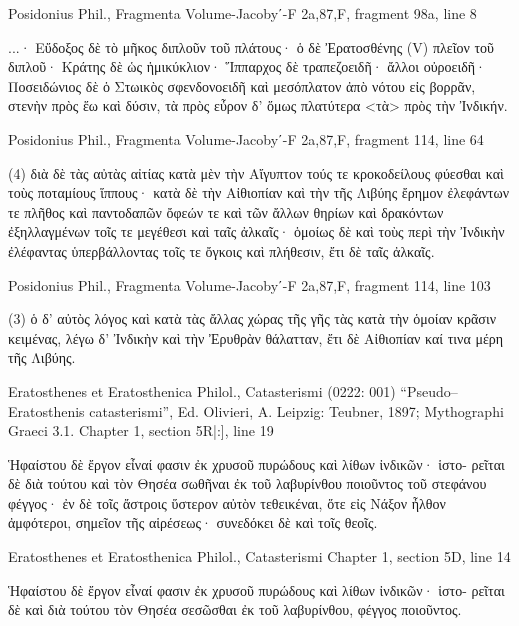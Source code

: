 \documentclass[12pt,letterpaper,twoside,final]{memoir}
\begin{document}
\begin{greek}
Posidonius Phil., Fragmenta 
Volume-Jacobyʹ-F 2a,87,F, fragment 98a, line 8

                           ...· Εὔδοξος δὲ τὸ μῆκος διπλοῦν τοῦ πλάτους· 
ὁ δὲ Ἐρατοσθένης (V) πλεῖον τοῦ διπλοῦ· Κράτης δὲ ὡς ἡμικύκλιον· 
Ἵππαρχος δὲ τραπεζοειδῆ· ἄλλοι οὐροειδῆ· Ποσειδώνιος δὲ ὁ Στωικὸς 
σφενδονοειδῆ καὶ μεσόπλατον ἀπὸ νότου εἰς βορρᾶν, στενὴν πρὸς ἕω καὶ 
δύσιν, τὰ πρὸς εὖρον δ' ὅμως πλατύτερα <τὰ> πρὸς τὴν Ἰνδικήν. 



Posidonius Phil., Fragmenta 
Volume-Jacobyʹ-F 2a,87,F, fragment 114, line 64

                               (4) διὰ δὲ τὰς αὐτὰς αἰτίας κατὰ μὲν τὴν Αἴγυπτον 
τούς τε κροκοδείλους φύεσθαι καὶ τοὺς ποταμίους ἵππους· κατὰ δὲ τὴν Αἰθιοπίαν 
καὶ τὴν τῆς Λιβύης ἔρημον ἐλεφάντων τε πλῆθος καὶ παντοδαπῶν ὄφεών τε καὶ 
τῶν ἄλλων θηρίων καὶ δρακόντων ἐξηλλαγμένων τοῖς τε μεγέθεσι καὶ ταῖς ἀλκαῖς· 
ὁμοίως δὲ καὶ τοὺς περὶ τὴν Ἰνδικὴν ἐλέφαντας ὑπερβάλλοντας τοῖς τε ὄγκοις καὶ 
πλήθεσιν, ἔτι δὲ ταῖς ἀλκαῖς. 



Posidonius Phil., Fragmenta 
Volume-Jacobyʹ-F 2a,87,F, fragment 114, line 103

                       (3) ὁ δ' αὐτὸς λόγος καὶ κατὰ τὰς ἄλλας χώρας τῆς γῆς τὰς 
κατὰ τὴν ὁμοίαν κρᾶσιν κειμένας, λέγω δ' Ἰνδικὴν καὶ τὴν Ἐρυθρὰν θάλατταν, ἔτι 
δὲ Αἰθιοπίαν καί τινα μέρη τῆς Λιβύης. 



Eratosthenes et Eratosthenica Philol., Catasterismi (0222: 001)
“Pseudo–Eratosthenis catasterismi”, Ed. Olivieri, A.
Leipzig: Teubner, 1897; Mythographi Graeci 3.1.
Chapter 1, section 5R|:], line 19

Ἡφαίστου δὲ ἔργον εἶναί 
φασιν ἐκ χρυσοῦ πυρώδους 
καὶ λίθων ἰνδικῶν· ἱστο-
ρεῖται δὲ διὰ τούτου καὶ 
τὸν Θησέα σωθῆναι ἐκ τοῦ 
λαβυρίνθου ποιοῦντος τοῦ 
στεφάνου φέγγος· ἐν δὲ 
τοῖς ἄστροις ὕστερον αὐτὸν 
τεθεικέναι, ὅτε εἰς Νάξον 
ἦλθον ἀμφότεροι, σημεῖον 
τῆς αἱρέσεως· συνεδόκει δὲ 
καὶ τοῖς θεοῖς. 



Eratosthenes et Eratosthenica Philol., Catasterismi 
Chapter 1, section 5D, line 14

Ἡφαίστου δὲ ἔργον εἶναί 
φασιν ἐκ χρυσοῦ πυρώδους 
καὶ λίθων ἰνδικῶν· ἱστο-
ρεῖται δὲ καὶ διὰ τούτου 
τὸν Θησέα σεσῶσθαι ἐκ 
τοῦ λαβυρίνθου, φέγγος 
ποιοῦντος. 
\end{greek}
\end{document}
